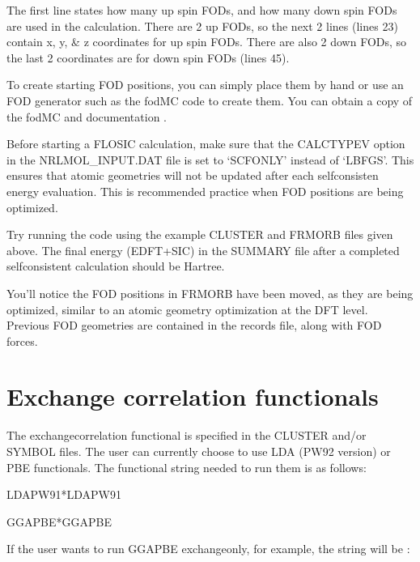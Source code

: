 \documentclass[letterpaper,10pt,english,openany,oneside]{sphinxmanual}
\begin{document}
\sphinxAtStartPar
The first line states how many up spin FODs, and how many down spin FODs are used in the calculation. There are 2 up FODs, so the next 2 lines (lines 2\sphinxhyphen{}3)
contain x, y, \& z coordinates for up spin FODs. There are also 2 down FODs, so the last 2 coordinates are for down spin FODs (lines 4\sphinxhyphen{}5).

\sphinxAtStartPar
To create starting FOD positions, you can simply place them by hand or use an FOD generator such as the fodMC code to create them.
You can obtain a copy of the fodMC and documentation .

\sphinxAtStartPar
Before starting a FLOSIC calculation, make sure that the CALCTYPEV option in the NRLMOL\_INPUT.DAT file is set to ‘SCF\sphinxhyphen{}ONLY’ instead of ‘LBFGS’.
This ensures that atomic geometries will not be updated after each self\sphinxhyphen{}consisten energy evaluation. This is recommended practice when FOD positions are being optimized.

\sphinxAtStartPar
Try running the code using the example CLUSTER and FRMORB files given above. The final energy (EDFT+SIC) in the SUMMARY file after a completed self\sphinxhyphen{}consistent calculation should be  Hartree.

\sphinxAtStartPar
You’ll notice the FOD positions in FRMORB have been moved, as they are being optimized, similar to an atomic geometry optimization at the DFT level.
Previous FOD geometries are contained in the records file, along with FOD forces.


\chapter{Exchange correlation functionals}
\label{\detokenize{docs/functionals:exchange-correlation-functionals}}\label{\detokenize{docs/functionals::doc}}
\sphinxAtStartPar
The exchange\sphinxhyphen{}correlation functional is specified in the CLUSTER and/or SYMBOL files. The user can currently choose to use LDA (PW92 version) or PBE functionals. The functional string needed to run them is as follows:

\sphinxAtStartPar
LDA\sphinxhyphen{}PW91*LDA\sphinxhyphen{}PW91

\sphinxAtStartPar
GGA\sphinxhyphen{}PBE*GGA\sphinxhyphen{}PBE

\sphinxAtStartPar
If the user wants to run GGA\sphinxhyphen{}PBE exchange\sphinxhyphen{}only, for example, the string will be :
\end{document}

